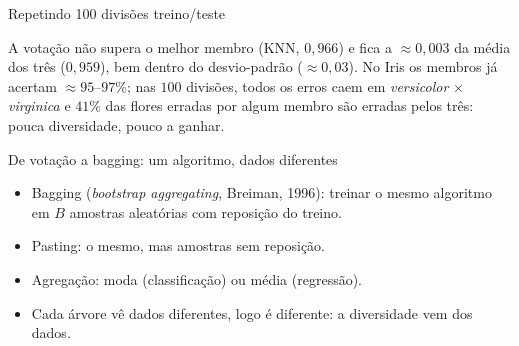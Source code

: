 \begin{frame}[fragile]{Repetindo 100 divisões treino/teste}

\vspace{3pt}

\vspace{3pt}
{\small A votação \alert{não} supera o melhor membro (KNN, $0{,}966$) e fica a $\approx0{,}003$ da média dos três ($0{,}959$), bem dentro do desvio-padrão ($\approx0{,}03$). No Iris os membros já acertam $\approx95$--$97\%$; nas $100$ divisões, \alert{todos} os erros caem em \emph{versicolor} $\times$ \emph{virginica} e $41\%$ das flores erradas por algum membro são erradas pelos \alert{três}: pouca diversidade, pouco a ganhar.}
\end{frame}

\begin{frame}{De votação a bagging: um algoritmo, dados diferentes}
\begin{itemize}
  \item \alert{Bagging} (\emph{bootstrap aggregating}, Breiman, 1996): treinar o \alert{mesmo} algoritmo em $B$ amostras aleatórias \alert{com reposição} do treino.
  \item \alert{Pasting}: o mesmo, mas amostras \alert{sem reposição}.
  \item Agregação: \alert{moda} (classificação) ou \alert{média} (regressão).
  \item Cada árvore vê dados diferentes, logo é diferente: a diversidade vem dos \alert{dados}.
\end{itemize}
\vspace{2pt}
\centering
{}
\end{frame}

